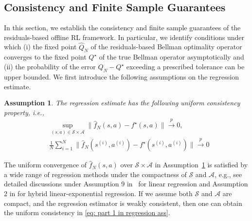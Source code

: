 \documentclass[letterpaper, 10 pt, conference]{ieeeconf}  %
\newtheorem{assumption}{Assumption}
\begin{document}
\subsection{Consistency and Finite Sample Guarantees}\label{sec:consistency}
In this section, we establish the consistency and finite sample guarantees of the residuals-based offline RL framework. In particular, we identify conditions under which (i) the fixed point $\hat{Q}_N$ of the residuals-based Bellman optimality operator converges to the fixed point $Q^\star$ of the true Bellman operator asymptotically and (ii) the probability of the error $\hat{Q}_N-Q^\star$ exceeding a prescribed tolerance can be upper bounded. We first introduce the following assumptions on the regression estimate.
\begin{assumption}\label{ass:regression estimate consistency}
The regression estimate has the following uniform consistency property, i.e., 
\begin{align}
    & \sup_{(s,a)\in\mathcal S\times\mathcal A}\|\hat f_N(s,a)-f^\star(s,a)\|\xrightarrow{p}0, \label{eq: part 1 in regression ass}\\
    & \frac{1}{N}\sum_{i=1}^N \|\hat{f}_N(s^{(i)},a^{(i)}) - f^\star(s^{(i)},a^{(i)})\| \xrightarrow{p} 0 \label{eq: part 2 in regression ass}
\end{align}
\end{assumption}

The uniform convergence of $\hat f_N(s,a)$ over $\mathcal S\times\mathcal A$ in Assumption\ \ref{ass:regression estimate consistency} is satisfied by a wide range of regression methods under the compactness of $\mathcal S$ and $\mathcal A$, e.g., see detailed discussions under Assumption 9 in\ \cite{zhu2024residuals} for linear regression and Assumption 2 in \cite{sun5078715contextual} for hybrid linear-exponential regression. If we assume both $\mathcal S$ and $\mathcal A$ are compact, and the regression estimator is weakly consistent, then one can obtain the uniform consistency in \eqref{eq: part 1 in regression ass}.
\end{document}
